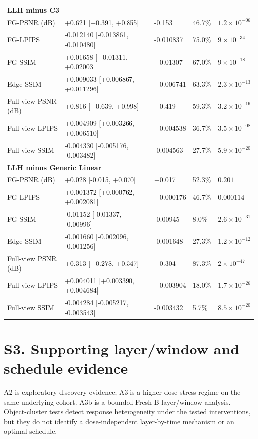 \documentclass[11pt]{article}
\begin{document}
\begin{longtable}{p{2.5cm}p{4.0cm}p{1.5cm}p{1.5cm}p{1.6cm}}
\multicolumn{5}{l}{\textbf{LLH minus C3}}\\
FG-PSNR (dB) & +0.621 [+0.391, +0.855] & -0.153 & 46.7\% & $1.2\times 10^{-06}$ \\
FG-LPIPS & -0.012140 [-0.013861, -0.010480] & -0.010837 & 75.0\% & $9\times 10^{-34}$ \\
FG-SSIM & +0.01658 [+0.01311, +0.02003] & +0.01307 & 67.0\% & $9\times 10^{-18}$ \\
Edge-SSIM & +0.009033 [+0.006867, +0.011296] & +0.006741 & 63.3\% & $2.3\times 10^{-13}$ \\
Full-view PSNR (dB) & +0.816 [+0.639, +0.998] & +0.419 & 59.3\% & $3.2\times 10^{-16}$ \\
Full-view LPIPS & +0.004909 [+0.003266, +0.006510] & +0.004538 & 36.7\% & $3.5\times 10^{-08}$ \\
Full-view SSIM & -0.004330 [-0.005176, -0.003482] & -0.004563 & 27.7\% & $5.9\times 10^{-20}$ \\
\multicolumn{5}{l}{\textbf{LLH minus Generic Linear}}\\
FG-PSNR (dB) & +0.028 [-0.015, +0.070] & +0.017 & 52.3\% & $0.201$ \\
FG-LPIPS & +0.001372 [+0.000762, +0.002081] & +0.000176 & 46.7\% & $0.000114$ \\
FG-SSIM & -0.01152 [-0.01337, -0.00996] & -0.00945 & 8.0\% & $2.6\times 10^{-31}$ \\
Edge-SSIM & -0.001660 [-0.002096, -0.001256] & -0.001648 & 27.3\% & $1.2\times 10^{-12}$ \\
Full-view PSNR (dB) & +0.313 [+0.278, +0.347] & +0.304 & 87.3\% & $2\times 10^{-47}$ \\
Full-view LPIPS & +0.004011 [+0.003390, +0.004684] & +0.003904 & 18.0\% & $1.7\times 10^{-26}$ \\
Full-view SSIM & -0.004284 [-0.005217, -0.003543] & -0.003432 & 5.7\% & $8.5\times 10^{-20}$ \\
\bottomrule
\end{longtable}

\endgroup

\section*{S3. Supporting layer/window and schedule evidence}
A2 is exploratory discovery evidence; A3 is a higher-dose stress regime on the same underlying cohort. A3b is a bounded Fresh B layer/window analysis. Object-cluster tests detect response heterogeneity under the tested interventions, but they do not identify a dose-independent layer-by-time mechanism or an optimal schedule.
\end{document}

